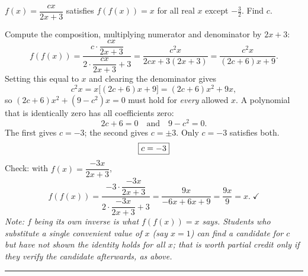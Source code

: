 \documentclass[11pt]{article}
\begin{document}
\begin{questions}[resume]
\item {}\\
  $f(x) = \dfrac{cx}{2x+3}$ satisfies $f(f(x)) = x$ for all real $x$ except $-\tfrac{3}{2}$.
  Find $c$.
  \begin{solution}
    Compute the composition, multiplying numerator and denominator by $2x+3$:
    \[
      f(f(x)) = \frac{c \cdot \dfrac{cx}{2x+3}}{2 \cdot \dfrac{cx}{2x+3} + 3}
              = \frac{c^2 x}{2cx + 3(2x+3)}
              = \frac{c^2 x}{(2c+6)x + 9}.
    \]
    Setting this equal to $x$ and clearing the denominator gives
    \[ c^2 x = x\big[(2c+6)x + 9\big] = (2c+6)x^2 + 9x, \]
    so $(2c+6)x^2 + (9 - c^2)x = 0$ must hold for \emph{every} allowed $x$. A polynomial
    that is identically zero has all coefficients zero:
    \[ 2c + 6 = 0 \quad\text{and}\quad 9 - c^2 = 0. \]
    The first gives $c = -3$; the second gives $c = \pm 3$. Only $c = -3$ satisfies both.
    \[ \fbox{$\displaystyle c = -3$} \]
    Check: with $f(x) = \dfrac{-3x}{2x+3}$,
    \[
      f(f(x)) = \frac{-3 \cdot \dfrac{-3x}{2x+3}}{2 \cdot \dfrac{-3x}{2x+3} + 3}
              = \frac{9x}{-6x + 6x + 9} = \frac{9x}{9} = x. \;\checkmark
    \]
    \textit{Note: $f$ being its own inverse is what $f(f(x)) = x$ says. Students who
    substitute a single convenient value of $x$ (say $x = 1$) can find a candidate for $c$
    but have not shown the identity holds for all $x$; that is worth partial credit only
    if they verify the candidate afterwards, as above.}
  \end{solution}

\end{questions}

\vspace{6pt}
\noindent\textcolor{rule}{\rule{\linewidth}{0.4pt}}\\[2pt]
\end{document}
